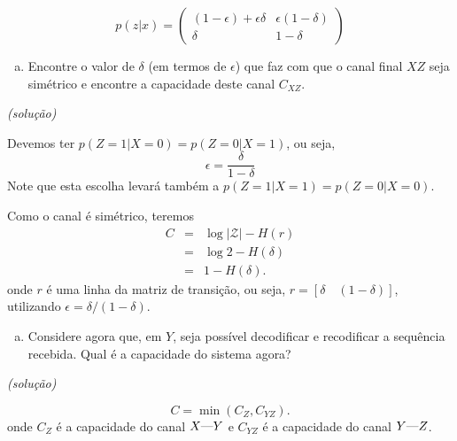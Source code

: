 \begin{frame}[allowframebreaks]
\begin{exercise}
  \exercisebreak

  \begin{equation}
  p(z|x) = 
    \begin{pmatrix}
    (1-\epsilon) + \epsilon \delta & \epsilon (1-\delta) \\
    \delta 	& 1-\delta
    \end{pmatrix}
  \end{equation}

  \exercisebreak
    
  \begin{enumerate}[b)]
  \item Encontre o valor de $\delta$ (em termos de $\epsilon$) que faz com que o canal final $XZ$
  seja simétrico e encontre a capacidade deste canal $C_{XZ}$.
  \end{enumerate}
  \textit{(solução)}

  Devemos ter $p(Z=1|X=0) = p(Z=0|X=1)$, ou seja,
  \begin{equation}
  \epsilon = \frac{\delta}{1-\delta}
  \end{equation}
  Note que esta escolha levará também a $p(Z=1|X=1) = p(Z=0|X=0)$.

  \exercisebreak

  Como o canal é simétrico, teremos
  \begin{eqnarray}
  C &=& \log \vert \mathcal{Z} \vert - H(r) \nonumber \\
	&=& \log 2 - H(\delta) \nonumber \\
	&=& 1 - H(\delta).
  \end{eqnarray} 
  onde $r$ é uma linha da matriz de transição, ou seja, $r = [\delta \quad (1-\delta)]$, utilizando 
  $\epsilon = \delta / (1 - \delta)$.

  \exercisebreak
  \begin{enumerate}[c)]
  \item Considere agora que, em $Y$, seja possível decodificar e recodificar a sequência recebida.
  Qual é a capacidade do sistema agora?
  \end{enumerate}
  \textit{(solução)}

  \begin{equation}
  C = \min (C_Z , C_{YZ}) .
  \end{equation}
  onde $C_Z$ é a capacidade do canal $X \text{\textemdash} Y$ e $C_{YZ}$ é a capacidade do canal $Y \text{\textemdash} Z$.
  \end{exercise}
\end{frame}


